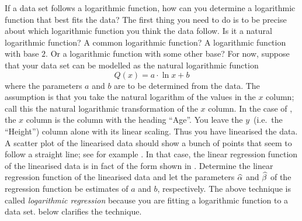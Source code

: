 \documentclass[a4paper,oneside,12pt]{article}
\begin{document}
If a data set follows a logarithmic function, how can you determine a
logarithmic function that best fits the data?  The first thing you
need to do is to be precise about which logarithmic function you think
the data follow.  Is it a natural logarithmic function?  A common
logarithmic function?  A logarithmic function with base $2$.  Or a
logarithmic function with some other base?  For now, suppose that your
data set can be modelled as the natural logarithmic function
\begin{equation}
\label{eqn:logarithm:log_scaling_horizontal_axis}
Q(x)
=
a \cdot \ln x + b
\end{equation}
where the parameters $a$ and $b$ are to be determined from the data.
The assumption is that you take the natural logarithm of the values in
the $x$ column; call this the natural logarithmic transformation of
the $x$ column.  In the case of ,
the $x$ column is the column with the heading ``Age''.  You leave the
$y$~(i.e.~the ``Height'') column alone with its linear scaling.  Thus
you have linearised the data.  A scatter plot of the linearised data
should show a bunch of points that seem to follow a straight line; see
for example .  In that case,
the linear regression function of the linearised data is in fact of
the form shown in
.  Determine the
linear regression function of the linearised data and let the
parameters $\widehat{\alpha}$ and $\widehat{\beta}$ of the regression function be
estimates of $a$ and $b$, respectively.  The above technique is called
\emph{logarithmic regression} because you are fitting a logarithmic
function to a data set.  
below clarifies the technique.

\begin{table}[!htbp]
\centering

\caption{%
  Detailed calculations of the logarithmic regression of the hinoki
  cypress data in .  The tree age
  column $t$ and the tree height column $y$ are the same as the
  columns in .  Each value in the
  $x$ column is the natural logarithmic transformation of the
  corresponding value in the age column $t$, i.e.~$x_i = \ln t_i$.  If
  $\xbar$ and $\ybar$ are the means of the $x$ and $y$ columns,
  respectively, then $d(x_i) = x_i - \xbar$ and
  $d(y_i) = y_i - \ybar$.  Most values in the table have been rounded
  to four decimal places in order to fit the table.  However, you
  should not round these intermediate results when you do your own
  calculations.
}
\label{tab:logarithm:hinoki_cypress_logarithmic_regression}
\end{table}
\end{document}
